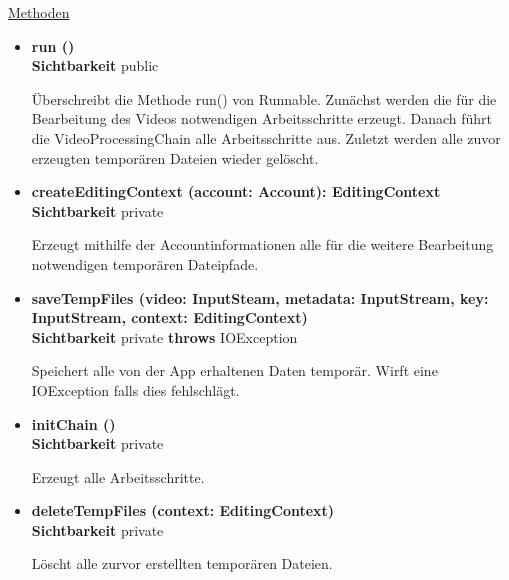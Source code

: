 \underline{Methoden}
\begin{itemize}
\itemsep0pt
\item \textbf{run ()}\hfill\\
\textbf{Sichtbarkeit} public

Überschreibt die Methode run() von Runnable. Zunächst werden die für die Bearbeitung des Videos notwendigen Arbeitsschritte erzeugt. Danach führt die VideoProcessingChain alle Arbeitsschritte aus. Zuletzt werden alle zuvor erzeugten temporären Dateien wieder gelöscht.

\item \textbf{createEditingContext (account: Account): EditingContext}\hfill\\
\textbf{Sichtbarkeit} private

Erzeugt mithilfe der Accountinformationen alle für die weitere Bearbeitung notwendigen temporären Dateipfade.

\item \textbf{saveTempFiles (video: InputSteam, metadata: InputStream, 
key: InputStream, context: EditingContext)}\hfill\\
\textbf{Sichtbarkeit} private \newline
\textbf{throws} IOException 

Speichert alle von der App erhaltenen Daten temporär. Wirft eine IOException falls dies fehlschlägt.

\item \textbf{initChain ()}\hfill\\
\textbf{Sichtbarkeit} private

Erzeugt alle Arbeitsschritte.

\item \textbf{deleteTempFiles (context: EditingContext)}\hfill\\
\textbf{Sichtbarkeit} private

Löscht alle zurvor erstellten temporären Dateien.

\end{itemize}